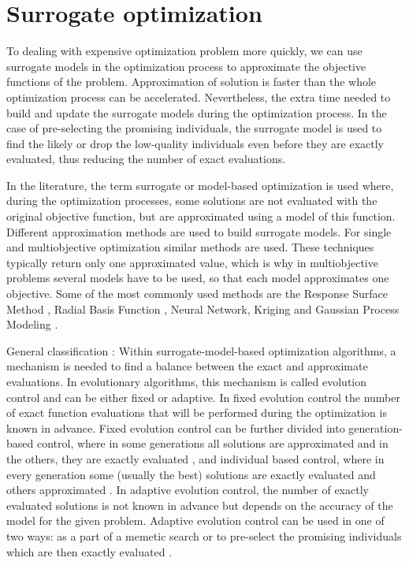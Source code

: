     \section{Surrogate optimization} 

        \cite{EngSurMod} 

        To dealing with expensive optimization problem more quickly, we can use surrogate models in the optimization process to approximate the objective functions of the problem. Approximation of solution is faster than the whole optimization process can be accelerated. Nevertheless, the extra time needed to build and update the surrogate models during the optimization process. 
        In the case of pre-selecting the promising individuals, the surrogate model is used to find the likely or drop the low-quality individuals even before they are exactly evaluated, thus reducing the number of exact evaluations.

        In the literature, the term surrogate or model-based optimization is used where, during the optimization processes, some solutions are not evaluated with the original objective function, but are approximated using a model of this function. Different approximation methods are used to build surrogate models. For single and multiobjective optimization similar methods are used. 
        These techniques typically return only one approximated value, which is why in multiobjective problems several models have to be used, so that each model approximates one objective. Some of the most commonly used methods are the Response Surface Method \cite{ResponseSurface}, Radial Basis Function \cite{Rasmussen2004}, Neural Network, Kriging \cite{Woodard00} and Gaussian Process Modeling \cite{RasmussenN10, RasmussenW06}.

        General classification \cite{MlakarPTF15}:
        Within surrogate-model-based optimization algorithms, a mechanism is needed to find a balance between the exact and approximate evaluations. In evolutionary algorithms, this mechanism is called evolution control \cite{Jin05} and can be either fixed or adaptive. In fixed evolution control the number of exact function evaluations that will be performed during the optimization is known in advance. Fixed evolution control can be further divided into generation-based control, where in some generations all solutions are approximated and in the others, they are exactly evaluated \cite{DebN07}, and individual based control, where in every generation some (usually the best) solutions are exactly evaluated and others approximated \cite{Grierson1993}. In adaptive evolution control, the number of exactly evaluated solutions is not known in advance but depends on the accuracy of the model for the given problem. Adaptive evolution control can be used in one of two ways: as a part of a memetic search or to pre-select the promising individuals which are then exactly evaluated \cite{PilatN12}.

